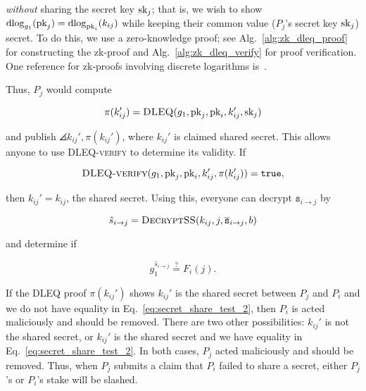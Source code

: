 \noindent
\emph{without} sharing the secret key $\textrm{sk}_{j}$;
that is, we wish to show
$\operatorname{dlog}_{g_{1}}(\textrm{pk}_{j}) = \operatorname{dlog}_{\textrm{pk}_{i}}(k_{ij})$
while keeping their common value ($P_{j}$'s secret key $\textrm{sk}_{j}$) secret.
To do this, we use a zero-knowledge proof;
see Alg.~\ref{alg:zk_dleq_proof} for constructing the zk-proof
and Alg.~\ref{alg:zk_dleq_verify} for proof verification.
One reference for zk-proofs involving discrete logarithms
is~\cite{camenisch1997proof}.

Thus, $P_{j}$ would compute

\begin{equation}
    \pi(k_{ij}') = \textsc{DLEQ}(g_{1},\textrm{pk}_{j},\textrm{pk}_{i},k_{ij}',\textrm{sk}_{j})
\end{equation}

\noindent
and publish $\angles{k_{ij}',\pi(k_{ij}')}$, where $k_{ij}'$
is claimed shared secret.
This allows anyone to use \textsc{DLEQ-verify} to determine
its validity.
If

\begin{equation}
    \textsc{DLEQ-verify}(g_{1},\textrm{pk}_{j},\textrm{pk}_{i},k_{ij}',\pi(k_{ij}'))
        = \texttt{true},
\end{equation}

\noindent
then $k_{ij}' = k_{ij}$, the shared secret.
Using this, everyone can decrypt $\overline{\texttt{s}}_{i\to j}$
by

\begin{equation}
    \hat{s}_{i\to j}
        = \textsc{DecryptSS}(k_{ij},j,\overline{\texttt{s}}_{i\to j}, b)
\end{equation}

\noindent
and determine if

\begin{equation}
    g_{1}^{\hat{s}_{i\to j}} \overset{?}{=} F_{i}(j).
    \label{eq:secret_share_test_2}
\end{equation}

\noindent
If the DLEQ proof $\pi(k_{ij}')$ shows $k_{ij}'$ is the shared
secret between $P_{j}$ and $P_{i}$ and we do not have equality in
Eq.~\eqref{eq:secret_share_test_2}, then $P_{i}$ is acted maliciously
and should be removed.
There are two other possibilities:
$k_{ij}'$ is not the shared secret, or $k_{ij}'$ is the shared secret
and we have equality in Eq.~\eqref{eq:secret_share_test_2}.
In both cases, $P_{j}$ acted maliciously and should be removed.
Thus, when $P_{j}$ submits a claim that $P_{i}$
failed to share a secret,
either $P_{j}$'s or $P_{i}$'s stake will be slashed.

